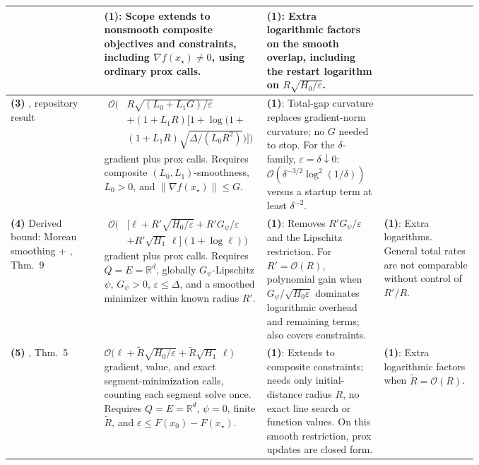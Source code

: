 \begin{table}[tp]
\begin{threeparttable}
\begin{tabularx}{\linewidth}{@{}>{\raggedright\arraybackslash}p{0.20\linewidth}>{\raggedright\arraybackslash}p{0.32\linewidth}>{\raggedright\arraybackslash}p{0.25\linewidth}>{\raggedright\arraybackslash}X@{}}
& \textbf{(1)}: Scope extends to nonsmooth composite objectives and constraints, including $\nabla f(x_\star)\ne0$, using ordinary prox calls.
& \textbf{(1)}: Extra logarithmic factors on the smooth overlap, including the restart logarithm on $R\sqrt{H_0/\varepsilon}$. \\
\midrule
\textbf{(3)} \citep{cgCompositeGeneralizedSource}, repository result
& $\begin{aligned}\mathcal{O}\bigl(&R\sqrt{(L_0+L_1G)/\varepsilon}\\ &+(1+L_1R)\bigl[1+\log\bigl(1+\\ &(1+L_1R)\sqrt{\Delta/(L_0R^2)}\bigr)\bigr]\bigr)\end{aligned}$ gradient plus prox calls. Requires composite $(L_0,L_1)$-smoothness, $L_0>0$, and $\|\nabla f(x_\star)\|\le G$.
& \textbf{(1)}: Total-gap curvature replaces gradient-norm curvature; no $G$ needed to stop. For the $\delta$-family, $\varepsilon=\delta\downarrow0$: $\mathcal{O}(\delta^{-3/2}\log^2(1/\delta))$ versus a startup term at least $\delta^{-2}$.
&  \\
\midrule
\textbf{(4)} Derived bound: Moreau smoothing + \citep{gssgLobanov2026}, Thm.~9
& $\begin{aligned}\mathcal{O}\bigl(&[\ell+R'\sqrt{H_0/\varepsilon}+R'G_\psi/\varepsilon\\ &+R'\sqrt{H_1}\,\ell](1+\log\ell)\bigr)\end{aligned}$ gradient plus prox calls. Requires $Q=E=\mathbb{R}^d$, globally $G_\psi$-Lipschitz $\psi$, $G_\psi>0$, $\varepsilon\le\Delta$, and a smoothed minimizer within known radius $R'$.
& \textbf{(1)}: Removes $R'G_\psi/\varepsilon$ and the Lipschitz restriction. For $R'=\mathcal{O}(R)$, polynomial gain when $G_\psi/\sqrt{H_0\varepsilon}$ dominates logarithmic overhead and remaining terms; also covers constraints.
& \textbf{(1)}: Extra logarithms. General total rates are not comparable without control of $R'/R$. \\
\midrule
\textbf{(5)} \citep{cgLobanov2026v1}, Thm.~5
& $\mathcal{O}\bigl(\ell+\widetilde R\sqrt{H_0/\varepsilon}+\widetilde R\sqrt{H_1}\,\ell\bigr)$ gradient, value, and exact segment-minimization calls, counting each segment solve once. Requires $Q=E=\mathbb{R}^d$, $\psi=0$, finite $\widetilde R$, and $\varepsilon\le F(x_0)-F(x_\star)$.
& \textbf{(1)}: Extends to composite constraints; needs only initial-distance radius $R$, no exact line search or function values. On this smooth restriction, prox updates are closed form.
& \textbf{(1)}: Extra logarithmic factors when $\widetilde R=\mathcal{O}(R)$. \\

\end{tabularx}
\end{threeparttable}
\end{table}
